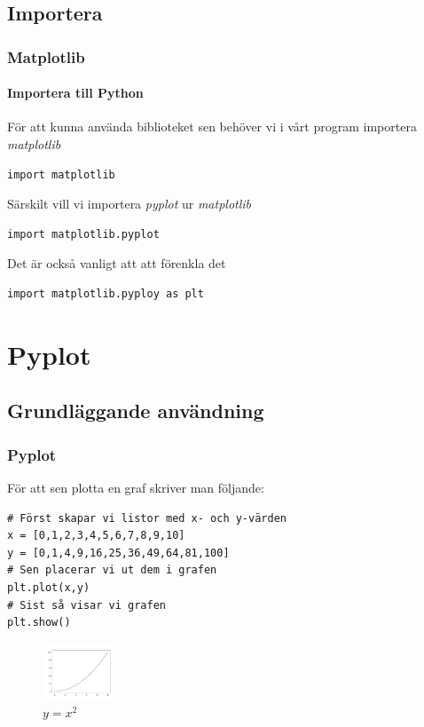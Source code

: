 \documentclass[aspectratio=169]{beamer}
\begin{document}
\subsection{Importera}

\begin{frame}[fragile]
\frametitle{Matplotlib}
\framesubtitle{Importera till Python}

För att kunna använda biblioteket sen behöver vi i vårt program importera \textit{matplotlib}

\begin{lstlisting}
import matplotlib
\end{lstlisting}

Särskilt vill vi importera \textit{pyplot} ur \textit{matplotlib}

\begin{lstlisting}
import matplotlib.pyplot
\end{lstlisting}

Det är också vanligt att att förenkla det

\begin{lstlisting}
import matplotlib.pyploy as plt
\end{lstlisting}

\end{frame}

\section{Pyplot}

\subsection{Grundläggande användning}

\begin{frame}[fragile]
\frametitle{Pyplot}

För att sen plotta en graf skriver man följande:

\begin{lstlisting}
# Först skapar vi listor med x- och y-värden
x = [0,1,2,3,4,5,6,7,8,9,10]
y = [0,1,4,9,16,25,36,49,64,81,100]
# Sen placerar vi ut dem i grafen
plt.plot(x,y)
# Sist så visar vi grafen
plt.show()
\end{lstlisting}

\begin{figure}
\includegraphics[width = 0.2\textwidth]{squares.png}
\caption{$y=x^2$}
\end{figure}

\end{frame}
\end{document}
